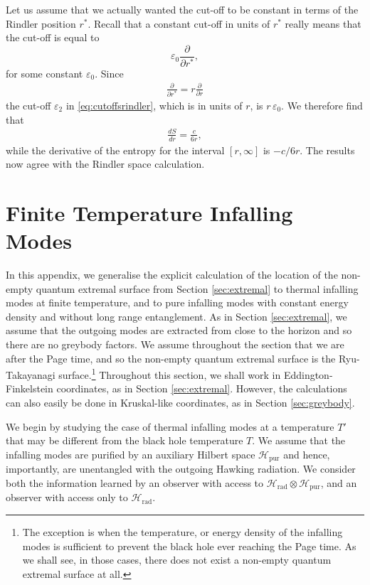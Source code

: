 \documentclass[12pt]{article}
\begin{document}
Let us assume that we actually wanted the cut-off to be constant in terms of the Rindler position $r^*$. Recall that a constant cut-off in units of $r^*$ really means that the cut-off is equal to
$$
\varepsilon_0 \frac{\partial}{\partial r^*},
$$
for some constant $\varepsilon_0$. Since
\begin{align}
\frac{\partial}{\partial r^*} = r \frac{\partial}{\partial r}
\end{align}
 the cut-off $\varepsilon_2$ in \eqref{eq:cutoffsrindler}, which is in units of $r$, is $r\, \varepsilon_0$. We therefore find that
 \begin{align}
 \frac{d S}{d r} = \frac{c}{6 r},
 \end{align}
 while the derivative of the entropy for the interval $[r,\infty]$ is $-c / 6 r$. The results now agree with the Rindler space calculation.

\section{Finite Temperature Infalling Modes} \label{app:finitetemp}

In this appendix, we generalise the explicit calculation of the location of the non-empty quantum extremal surface from Section \ref{sec:extremal} to thermal infalling modes at finite temperature, and to pure infalling modes with constant energy density and without long range entanglement. As in Section \ref{sec:extremal}, we assume that the outgoing modes are extracted from close to the horizon and so there are no greybody factors. We assume throughout the section that we are after the Page time, and so the non-empty quantum extremal surface is the Ryu-Takayanagi surface.\footnote{The exception is when the temperature, or energy density of the infalling modes is sufficient to prevent the black hole ever reaching the Page time. As we shall see, in those cases, there does not exist a non-empty quantum extremal surface at all.} Throughout this section, we shall work in Eddington-Finkelstein coordinates, as in Section \ref{sec:extremal}. However, the calculations can also easily be done in Kruskal-like coordinates, as in Section \ref{sec:greybody}.

We begin by studying the case of thermal infalling modes at a temperature $T'$ that may be different from the black hole temperature $T$. We assume that the infalling modes are purified by an auxiliary Hilbert space $\mathcal{H}_\text{pur}$ and hence, importantly, are unentangled with the outgoing Hawking radiation. We consider both the information learned by an observer with access to $\mathcal{H}_\text{rad} \otimes \mathcal{H}_\text{pur}$, and an observer with access only to $\mathcal{H}_\text{rad}$.
\end{document}
